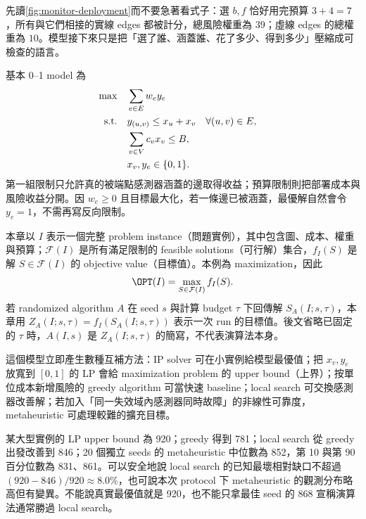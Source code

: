 \documentclass[11pt,a4paper,oneside,openany]{book}
\begin{document}
先讀\cref{fig:monitor-deployment}而不要急著看式子：選 $b,f$ 恰好用完預算 $3+4=7$，所有與它們相接的實線 edges 都被計分，總風險權重為 $39$；虛線 edges 的總權重為 $10$。模型接下來只是把「選了誰、涵蓋誰、花了多少、得到多少」壓縮成可檢查的語言。

基本 0--1 model 為
\begin{align}
 \max\quad&\sum_{e\in E}w_ey_e                                      \notag\\
 \text{s.t.}\quad&y_{(u,v)}\le x_u+x_v &&\forall (u,v)\in E,          \label{eq:monitor-model}\\
 &\sum_{v\in V}c_vx_v\le B,                                           \notag\\
 &x_v,y_e\in\{0,1\}.                                                  \notag
\end{align}
第一組限制只允許真的被端點感測器涵蓋的邊取得收益；預算限制則把部署成本與風險收益分開。因 $w_e\ge0$ 且目標最大化，若一條邊已被涵蓋，最優解自然會令 $y_e=1$，不需再寫反向限制。

\begin{definition}
本章以 $I$ 表示一個完整 problem instance（問題實例），其中包含圖、成本、權重與預算；$\mathcal F(I)$ 是所有滿足限制的 feasible solutions（可行解）集合，$f_I(S)$ 是解 $S\in\mathcal F(I)$ 的 objective value（目標值）。本例為 maximization，因此
\[
 \OPT(I)=\max_{S\in\mathcal F(I)} f_I(S).
\]
若 randomized algorithm $A$ 在 seed $s$ 與計算 budget $\tau$ 下回傳解 $S_A(I;s,\tau)$，本章用
$Z_A(I;s,\tau)=f_I(S_A(I;s,\tau))$ 表示一次 run 的目標值。後文省略已固定的 $\tau$ 時，$A(I,s)$ 是 $Z_A(I;s,\tau)$ 的簡寫，不代表演算法本身。
\end{definition}

這個模型立即產生數種互補方法：IP solver 可在小實例給模型最優值；把 $x_v,y_e$ 放寬到 $[0,1]$ 的 LP 會給 maximization problem 的 upper bound（上界）；按單位成本新增風險的 greedy algorithm 可當快速 baseline；local search 可交換感測器改善解；若加入「同一失效域內感測器同時故障」的非線性可靠度，metaheuristic 可處理較難的擴充目標。

\begin{example}[一筆結果應如何被閱讀]
某大型實例的 LP upper bound 為 920；greedy 得到 781；local search 從 greedy 出發改善到 846；20 個獨立 seeds 的 metaheuristic 中位數為 852，第 10 與第 90 百分位數為 831、861。可以安全地說 local search 的已知最壞相對缺口不超過 $(920-846)/920\approx8.0\%$，也可說本次 protocol 下 metaheuristic 的觀測分布略高但有變異。不能說真實最優值就是 920，也不能只拿最佳 seed 的 868 宣稱演算法通常勝過 local search。
\end{example}
\end{document}
